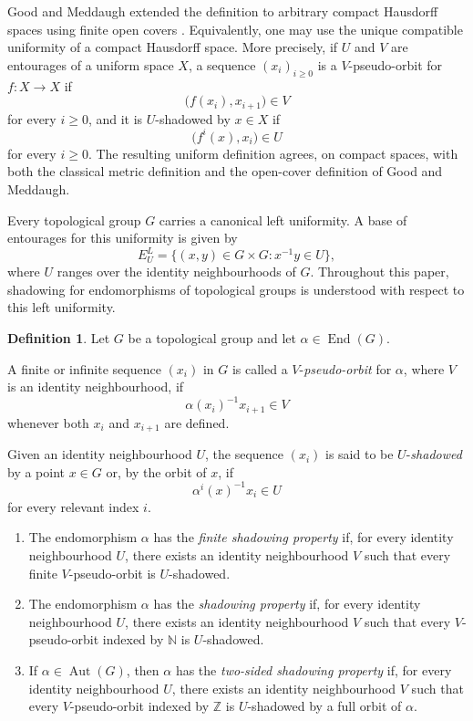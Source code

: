 \documentclass[12pt]{amsart}
\theoremstyle{definition}
\newtheorem{definition}[theorem]{Definition}
\numberwithin{equation}{section}
\theoremstyle{remark}
\def\Aut{\operatorname{Aut}}
\def\End{\operatorname{End}}
\begin{document}
Good and Meddaugh extended the definition to arbitrary compact
Hausdorff spaces using finite open covers \cite{GM}. Equivalently, one
may use the unique compatible uniformity of a compact Hausdorff space.
More precisely, if $U$ and $V$ are entourages of a uniform space
$X$, a sequence $(x_i)_{i\geq0}$ is a $V$-pseudo-orbit for
$f:X\to X$ if
\[
\bigl(f(x_i),x_{i+1}\bigr)\in V
\]
for every $i\geq0$, and it is $U$-shadowed by $x\in X$ if
\[
\bigl(f^i(x),x_i\bigr)\in U
\]
for every $i\geq0$. The resulting uniform definition agrees, on
compact spaces, with both the classical metric definition and the
open-cover definition of Good and Meddaugh.

Every topological group $G$ carries a canonical left uniformity. A
base of entourages for this uniformity is given by
\[
E_U^L
=
\{(x,y)\in G\times G:x^{-1}y\in U\},
\]
where $U$ ranges over the identity neighbourhoods of $G$. Throughout
this paper, shadowing for endomorphisms of topological groups is
understood with respect to this left uniformity.

\begin{definition}\label{def:shadowing}
Let $G$ be a topological group and let $\alpha\in\End(G)$.

A finite or infinite sequence $(x_i)$ in $G$ is called a
$V$-\emph{pseudo-orbit} for $\alpha$, where $V$ is an identity
neighbourhood, if
\[
\alpha(x_i)^{-1}x_{i+1}\in V
\]
whenever both $x_i$ and $x_{i+1}$ are defined.

Given an identity neighbourhood $U$, the sequence $(x_i)$ is said to
be $U$-\emph{shadowed} by a point $x\in G$ or, by the orbit of $x$, if
\[
\alpha^i(x)^{-1}x_i\in U
\]
for every relevant index $i$.

\begin{enumerate}
\item The endomorphism $\alpha$ has the \emph{finite shadowing
property} if, for every identity neighbourhood $U$, there exists an
identity neighbourhood $V$ such that every finite $V$-pseudo-orbit is
$U$-shadowed.

\item The endomorphism $\alpha$ has the \emph{shadowing property} if,
for every identity neighbourhood $U$, there exists an identity
neighbourhood $V$ such that every $V$-pseudo-orbit indexed by
$\mathbb N$ is $U$-shadowed.

\item If $\alpha\in\Aut(G)$, then $\alpha$ has the
\emph{two-sided shadowing property} if, for every identity
neighbourhood $U$, there exists an identity neighbourhood $V$ such
that every $V$-pseudo-orbit indexed by $\mathbb Z$ is $U$-shadowed by
a full orbit of $\alpha$.
\end{enumerate}
\end{definition}
\end{document}
